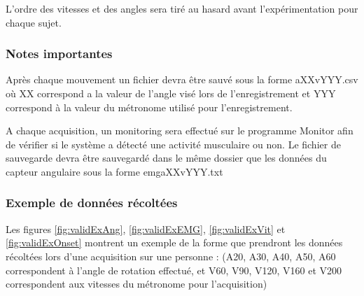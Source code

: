 \documentclass[letterpaper, twoside, 12pt, memoire, creativecommons, hyperref]{thETS}
\begin{document}
L’ordre des vitesses et des angles sera tiré au hasard avant l’expérimentation pour chaque sujet.

\subsubsection{Notes importantes}

Après chaque mouvement un fichier devra être sauvé sous la forme aXXvYYY.csv où XX correspond a la valeur de l’angle visé lors de l’enregistrement et YYY correspond à la valeur du métronome utilisé pour l’enregistrement.

A chaque acquisition, un monitoring sera effectué sur le programme Monitor afin de vérifier si le système a détecté une activité musculaire ou non. Le fichier de sauvegarde devra être sauvegardé dans le même dossier que les données du capteur angulaire sous la forme emgaXXvYYY.txt

\subsubsection{Exemple de données récoltées}

Les figures \ref{fig:validExAng}, \ref{fig:validExEMG}, \ref{fig:validExVit} et \ref{fig:validExOnset} montrent un exemple de la forme que prendront les données récoltées lors d’une acquisition sur une personne : (A20, A30, A40, A50, A60 correspondent à l’angle de rotation effectué, et V60, V90, V120, V160 et V200 correspondent aux vitesses du métronome pour l’acquisition)
\end{document}
